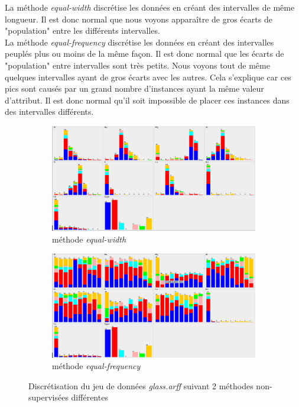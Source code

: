 \documentclass[11pt,a4paper]{article}
\begin{document}
			La méthode \textit{equal-width} discrétise les données en créant des intervalles de même longueur. Il est donc normal que nous voyons apparaître de gros écarts de "population" entre les différents intervalles.\\
			
			La méthode \textit{equal-frequency} discrétise les données en créant des intervalles peuplés plus ou moins de la même façon. Il est donc normal que les écarts  de "population" entre intervalles sont très petits. Nous voyons tout de même quelques intervalles ayant de gros écarts avec les autres. Cela s'explique car ces pics sont causés par un grand nombre d'instances ayant la même valeur d'attribut. Il est donc normal qu'il soit impossible de placer ces instances dans des intervalles différents.
			
			\begin{figure}[h]
				\centering
				\begin{subfigure}{.5\textwidth}
					\centering
					\includegraphics[width=.9\textwidth]{glass_disc_width}
					\caption{méthode \textit{equal-width}}
				\end{subfigure}%
				\begin{subfigure}{.5\textwidth}
					\centering
					\includegraphics[width=.9\textwidth]{glass_disc_freq}
					\caption{méthode \textit{equal-frequency}}
				\end{subfigure}
				
				\caption{Discrétisation du jeu de données \textit{glass.arff} suivant 2 méthodes non-supervisées différentes}
				\label{fig:glass:disc}
			\end{figure}
			
\end{document}
